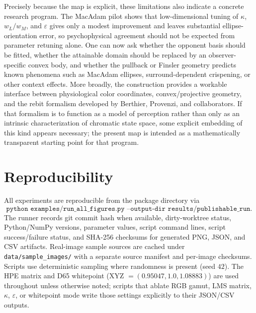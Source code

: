 \documentclass[11pt]{article}
\theoremstyle{plain}
\theoremstyle{definition}
\theoremstyle{remark}
\begin{document}
Precisely because the map is explicit, these limitations also indicate a concrete research program. The MacAdam pilot shows that low-dimensional tuning of $\kappa$, $w_L/w_M$, and $\varepsilon$ gives only a modest improvement and leaves substantial ellipse-orientation error, so psychophysical agreement should not be expected from parameter retuning alone. One can now ask whether the opponent basis should be fitted, whether the attainable domain should be replaced by an observer-specific convex body, and whether the pullback or Finsler geometry predicts known phenomena such as MacAdam ellipses, surround-dependent crispening, or other context effects. More broadly, the construction provides a workable interface between physiological color coordinates, convex/projective geometry, and the rebit formalism developed by Berthier, Provenzi, and collaborators. If that formalism is to function as a model of perception rather than only as an intrinsic characterization of chromatic state space, some explicit embedding of this kind appears necessary; the present map is intended as a mathematically transparent starting point for that program.

\section{Reproducibility}
\label{sec:reproducibility}

All experiments are reproducible from the package directory via
\[
\texttt{python examples/run\_all\_figures.py --output-dir results/publishable\_run}.
\]
The runner records git commit hash when available, dirty-worktree status, Python/NumPy versions, parameter values, script command lines, script success/failure status, and SHA-256 checksums for generated PNG, JSON, and CSV artifacts. Real-image sample sources are cached under \texttt{data/sample\_images/} with a separate source manifest and per-image checksums. Scripts use deterministic sampling where randomness is present (seed $42$). The HPE matrix and D65 whitepoint (XYZ $= (0.95047, 1.0, 1.08883)$) are used throughout unless otherwise noted; scripts that ablate RGB gamut, LMS matrix, $\kappa$, $\varepsilon$, or whitepoint mode write those settings explicitly to their JSON/CSV outputs.

\end{document}

